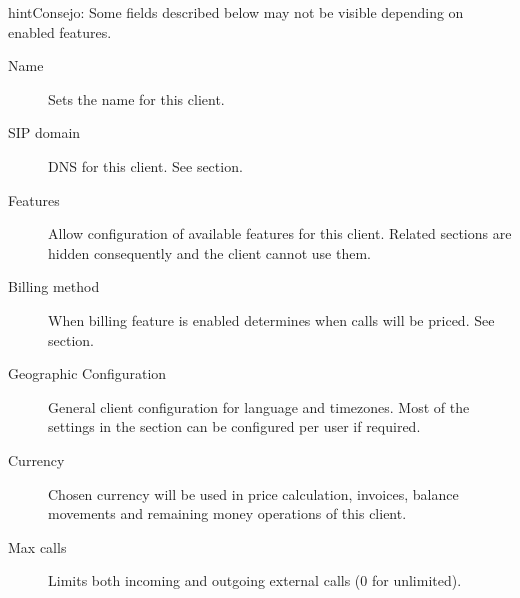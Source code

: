 \documentclass[letterpaper,10pt,spanish]{sphinxmanual}
\begin{document}
\begin{notice}{hint}{Consejo:}
Some fields described below may not be visible depending on enabled features.
\end{notice}
\begin{description}
\item[{Name}] \leavevmode{}\label{administration_portal/brand/clients/virtual_pbx:term-name}
Sets the name for this client.

\item[{SIP domain}] \leavevmode{}\label{administration_portal/brand/clients/virtual_pbx:term-sip-domain}
DNS for this client. See {\hyperref[getting_started/internal_calls/brand_portal:client\string-sip\string-domain]{}} section.

\item[{Features}] \leavevmode{}\label{administration_portal/brand/clients/virtual_pbx:term-features}
Allow configuration of available features for this client.
Related sections are hidden consequently and the client cannot use them.

\item[{Billing method}] \leavevmode{}\label{administration_portal/brand/clients/virtual_pbx:term-billing-method}
When billing feature is enabled determines when calls will be priced. See {\hyperref[administration_portal/brand/billing/index:billing]{}} section.

\item[{Geographic Configuration}] \leavevmode{}\label{administration_portal/brand/clients/virtual_pbx:term-geographic-configuration}
General client configuration for language and timezones. Most of the settings in the section can be
configured per user if required.

\item[{Currency}] \leavevmode{}\label{administration_portal/brand/clients/virtual_pbx:term-currency}
Chosen currency will be used in price calculation, invoices, balance movements and
remaining money operations of this client.

\item[{Max calls}] \leavevmode{}\label{administration_portal/brand/clients/virtual_pbx:term-max-calls}
Limits both incoming and outgoing external calls (0 for unlimited).


\end{description}
\end{document}
